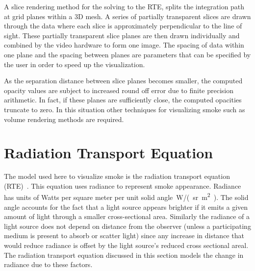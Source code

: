 A slice rendering method for the solving to the RTE,  splits the
integration path at grid planes within a 3D mesh.
A series of partially transparent slices are drawn through the data where each
slice is approximately perpendicular to the line of sight.
These partially transparent slice planes are then drawn
individually and combined by the video hardware to form one image.
The spacing of data within one plane and the spacing between planes are parameters
that can be specified by the user in order to speed up the visualization.

As the separation distance between slice planes becomes smaller, the
computed opacity values are subject to increased round off error
due to finite precision arithmetic.  In fact, if these planes are
sufficiently close, the computed opacities truncate to zero.   In
this situation other techniques for visualizing smoke such as volume rendering methods are required.


\section{Radiation Transport Equation}
The model used here to visualize smoke is the radiation transport
equation (RTE)~\cite{Siegel:2001}.  This equation uses radiance to
represent smoke appearance.  Radiance has units of Watts per
square meter per unit solid angle~\si{W/(sr.m^2)}.  The solid
angle accounts for the fact that a light source appears brighter
if it emits a given amount of light through a smaller
cross-sectional area.  Similarly the radiance of a light source does not
depend on distance from the
observer (unless a participating medium is present to absorb or
scatter  light) since any increase in distance that would reduce radiance is offset
by the light source's reduced cross sectional areal.
The radiation transport equation discussed in
this section models the change in radiance due to these factors.

\renewcommand{\dx}[1]{\,\mbox{d}#1}
\newcommand{\siga}{ \sigma_a(x) }
\newcommand{\sigt}{ \sigma_t(x) }
\newcommand{\sigs}{ \sigma_s(x) }
\newcommand{\sigts}{ \sigma_t(s) }
\newcommand{\Le}{ C_e(x) }
\newcommand{\Lexo}{ C_e(x,\omega) }
\newcommand{\Lxo}{ C(x,\omega) }
\newcommand{\dLdx}{ \frac{\dx{C}}{\dx{x}}(x)}
\newcommand{\intf}[2]{ \exp\left({\int_{#1}^{#2} \sigts \dx{s}}\right) }
\newcommand{\intff}[2]{ {\int_{#1}^{#2} \sigts \dx{s}} }
\newcommand{\intmf}[2]{ \exp\left({-\int_{#1}^{#2} \sigts \dx{s}}\right) }
\newcommand{\intmff}[2]{ {-\int_#1^#2 \sigts \dx{s}} }
\newcommand{\ddx}{ \frac{\mbox{d}}{\dx{x}} }

